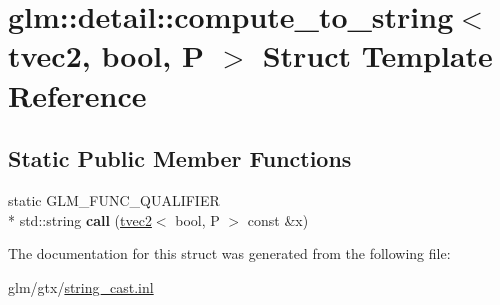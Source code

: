 \hypertarget{structglm_1_1detail_1_1compute__to__string_3_01tvec2_00_01bool_00_01P_01_4}{\section{glm\-:\-:detail\-:\-:compute\-\_\-to\-\_\-string$<$ tvec2, bool, P $>$ Struct Template Reference}
\label{structglm_1_1detail_1_1compute__to__string_3_01tvec2_00_01bool_00_01P_01_4}
}
\subsection*{Static Public Member Functions}
\begin{DoxyCompactItemize}
\item 
\hypertarget{structglm_1_1detail_1_1compute__to__string_3_01tvec2_00_01bool_00_01P_01_4_a860277b13f804aa978482f1bed3de777}{static G\-L\-M\-\_\-\-F\-U\-N\-C\-\_\-\-Q\-U\-A\-L\-I\-F\-I\-E\-R \\*
std\-::string {\bfseries call} (\hyperlink{structglm_1_1tvec2}{tvec2}$<$ bool, P $>$ const \&x)}\label{structglm_1_1detail_1_1compute__to__string_3_01tvec2_00_01bool_00_01P_01_4_a860277b13f804aa978482f1bed3de777}

\end{DoxyCompactItemize}


The documentation for this struct was generated from the following file\-:\begin{DoxyCompactItemize}
\item 
glm/gtx/\hyperlink{string__cast_8inl}{string\-\_\-cast.\-inl}\end{DoxyCompactItemize}
